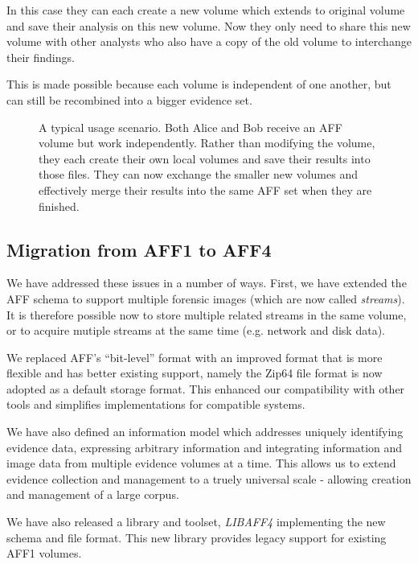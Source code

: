 \documentclass[10pt, conference]{IEEEtran}
\begin{document}
In this case they can each create a new volume which extends to
original volume and save their analysis on this new volume. Now they
only need to share this new volume with other analysts who also have a
copy of the old volume to interchange their findings.

This is made possible because each volume is independent of one
another, but can still be recombined into a bigger evidence set. 

\begin{figure}[tb]
  \begin{center}
  \mbox{\columnwidth {}}
  \caption{A typical usage scenario. Both Alice and Bob receive an AFF
  volume but work independently. Rather than modifying the volume,
  they each create their own local volumes and save their results into
  those files. They can now exchange the smaller new volumes and
  effectively merge their results into the same AFF set when they are finished.}
  \label{usage}
  \end{center}
\end{figure}

\subsection{Migration from AFF1 to AFF4}
We have addressed these issues in a number of ways. First, we have
extended the AFF schema to support multiple forensic images (which are
now called \emph{streams}). It is therefore possible now to store
multiple related streams in the same volume, or to acquire mutiple
streams at the same time (e.g. network and disk data).

We replaced AFF's ``bit-level'' format with an improved format that is
more flexible and has better existing support, namely the Zip64 file
format is now adopted as a default storage format. This enhanced our
compatibility with other tools and simplifies implementations for
compatible systems.

We have also defined an information model which addresses uniquely
identifying evidence data, expressing arbitrary information and
integrating information and image data from multiple evidence volumes
at a time. This allows us to extend evidence collection and management
to a truely universal scale - allowing creation and management of a
large corpus.

We have also released a library and toolset, \emph{LIBAFF4}
implementing the new schema and file format. This new library provides
legacy support for existing AFF1 volumes.
\end{document}
